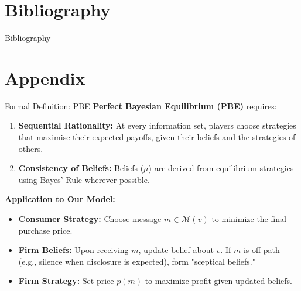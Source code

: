 \documentclass{beamer}
\begin{document}
\section*{Bibliography}
\begin{frame}{Bibliography}
    \printbibliography
\end{frame}
    
\appendix
\section*{Appendix}

\begin{frame}{Formal Definition: PBE} \label{PBE}
    \textbf{Perfect Bayesian Equilibrium (PBE)} requires:
    \vspace{0.2cm}
    \begin{enumerate}
        \item \textbf{Sequential Rationality:} 
        At every information set, players choose strategies that maximise their expected payoffs, given their beliefs and the strategies of others.
        
        \item \textbf{Consistency of Beliefs:} 
        Beliefs ($\mu$) are derived from equilibrium strategies using Bayes' Rule wherever possible.
    \end{enumerate}

    \vspace{0.4cm}
    \textbf{Application to Our Model:}
    \begin{itemize}
        \item \textbf{Consumer Strategy:} Choose message $m \in \mathcal{M}(v)$ to minimize the final purchase price.
        \item \textbf{Firm Beliefs:} Upon receiving $m$, update belief about $v$. If $m$ is off-path (e.g., silence when disclosure is expected), form "sceptical beliefs."
        \item \textbf{Firm Strategy:} Set price $p(m)$ to maximize profit given updated beliefs.
    \end{itemize}
\end{frame}
\end{document}
